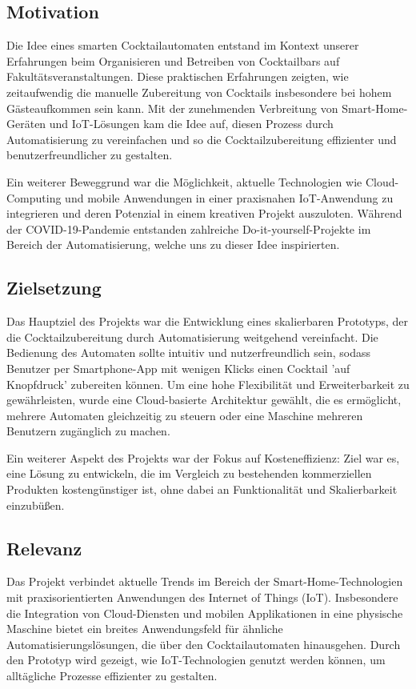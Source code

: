 \subsection{Motivation}
Die Idee eines smarten Cocktailautomaten entstand im Kontext unserer Erfahrungen beim Organisieren 
und Betreiben von Cocktailbars auf Fakultätsveranstaltungen. Diese praktischen Erfahrungen zeigten, 
wie zeitaufwendig die manuelle Zubereitung von Cocktails insbesondere bei hohem Gästeaufkommen sein 
kann. Mit der zunehmenden Verbreitung von Smart-Home-Geräten und IoT-Lösungen kam die Idee auf, 
diesen Prozess durch Automatisierung zu vereinfachen und so die Cocktailzubereitung effizienter und 
benutzerfreundlicher zu gestalten. 

Ein weiterer Beweggrund war die Möglichkeit, aktuelle Technologien wie Cloud-Computing und mobile 
Anwendungen in einer praxisnahen IoT-Anwendung zu integrieren und deren Potenzial in einem kreativen 
Projekt auszuloten. Während der COVID-19-Pandemie entstanden zahlreiche Do-it-yourself-Projekte im 
Bereich der Automatisierung, welche uns zu dieser Idee inspirierten.

\subsection{Zielsetzung}
Das Hauptziel des Projekts war die Entwicklung eines skalierbaren Prototyps, der die 
Cocktailzubereitung durch Automatisierung weitgehend vereinfacht. Die Bedienung des Automaten 
sollte intuitiv und nutzerfreundlich sein, sodass Benutzer per Smartphone-App mit wenigen Klicks 
einen Cocktail 'auf Knopfdruck' zubereiten können. Um eine hohe Flexibilität und Erweiterbarkeit 
zu gewährleisten, wurde eine Cloud-basierte Architektur gewählt, die es ermöglicht, mehrere 
Automaten gleichzeitig zu steuern oder eine Maschine mehreren Benutzern zugänglich zu machen. 

Ein weiterer Aspekt des Projekts war der Fokus auf Kosteneffizienz: Ziel war es, eine Lösung zu 
entwickeln, die im Vergleich zu bestehenden kommerziellen Produkten kostengünstiger ist, ohne dabei 
an Funktionalität und Skalierbarkeit einzubüßen.

\subsection{Relevanz}
Das Projekt verbindet aktuelle Trends im Bereich der Smart-Home-Technologien mit praxisorientierten 
Anwendungen des Internet of Things (IoT). Insbesondere die Integration von Cloud-Diensten und 
mobilen Applikationen in eine physische Maschine bietet ein breites Anwendungsfeld für ähnliche 
Automatisierungslösungen, die über den Cocktailautomaten hinausgehen. Durch den Prototyp wird 
gezeigt, wie IoT-Technologien genutzt werden können, um alltägliche Prozesse effizienter zu 
gestalten. 

